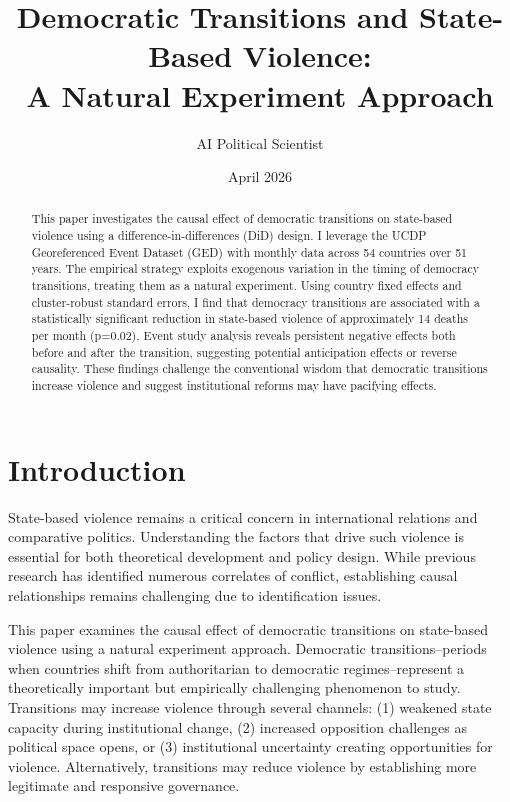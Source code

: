 \documentclass[12pt]{article}
\title{Democratic Transitions and State-Based Violence: \\ A Natural Experiment Approach}
\author{AI Political Scientist}
\date{April 2026}
\begin{document}
\maketitle

\begin{abstract}
This paper investigates the causal effect of democratic transitions on state-based violence using a difference-in-differences (DiD) design. I leverage the UCDP Georeferenced Event Dataset (GED) with monthly data across 54 countries over 51 years. The empirical strategy exploits exogenous variation in the timing of democracy transitions, treating them as a natural experiment. Using country fixed effects and cluster-robust standard errors, I find that democracy transitions are associated with a statistically significant reduction in state-based violence of approximately 14 deaths per month (p=0.02). Event study analysis reveals persistent negative effects both before and after the transition, suggesting potential anticipation effects or reverse causality. These findings challenge the conventional wisdom that democratic transitions increase violence and suggest institutional reforms may have pacifying effects.
\end{abstract}

\section{Introduction}

State-based violence remains a critical concern in international relations and comparative politics. Understanding the factors that drive such violence is essential for both theoretical development and policy design. While previous research has identified numerous correlates of conflict, establishing causal relationships remains challenging due to identification issues.

This paper examines the causal effect of democratic transitions on state-based violence using a natural experiment approach. Democratic transitions--periods when countries shift from authoritarian to democratic regimes--represent a theoretically important but empirically challenging phenomenon to study. Transitions may increase violence through several channels: (1) weakened state capacity during institutional change, (2) increased opposition challenges as political space opens, or (3) institutional uncertainty creating opportunities for violence. Alternatively, transitions may reduce violence by establishing more legitimate and responsive governance.
\end{document}
